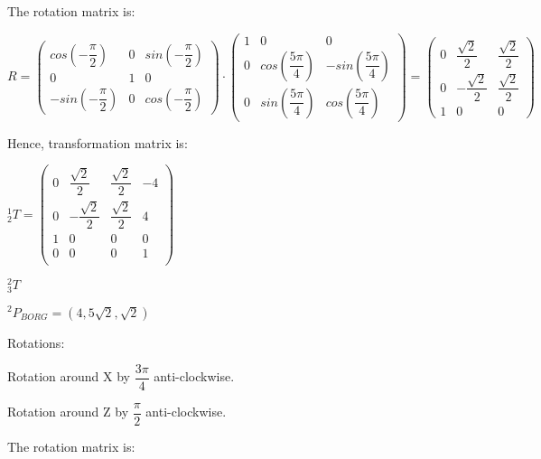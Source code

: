 \documentclass[12pt]{article}
\begin{document}
\begin{list}{)~}{}
The rotation matrix is:

$R=\left(\begin{array}{ccc}
cos \left( -\dfrac{\pi}{2} \right) & 0 & sin \left( -\dfrac{\pi}{2} \right) \\
0 & 1 & 0\\
-sin \left( -\dfrac{\pi}{2} \right) & 0 & cos \left(-\dfrac{\pi}{2} \right)
\end{array}\right)
\cdot
\left(\begin{array}{ccc}
1 & 0 & 0 \\
0 & cos \left( \dfrac{5 \pi}{4} \right) & -sin \left( \dfrac{5 \pi}{4} \right) \\
0 & sin \left( \dfrac{5 \pi}{4} \right) & cos \left( \dfrac{5 \pi}{4} \right) \end{array}\right)=
\left(\begin{array}{ccc}
0 & \dfrac{\sqrt{2}}{2} & \dfrac{\sqrt{2}}{2} \\
0 & -\dfrac{\sqrt{2}}{2} & \dfrac{\sqrt{2}}{2} \\
1 & 0 & 0\end{array}\right)$

Hence, transformation matrix is:
 
$_{2}^1T = \left(\begin{array}{cccc}
0 & \dfrac{\sqrt{2}}{2} & \dfrac{\sqrt{2}}{2} & -4 \\
0 & -\dfrac{\sqrt{2}}{2} & \dfrac{\sqrt{2}}{2} &  4 \\
1 & 0 & 0 & 0\\
0 & 0 & 0 & 1\\
\end{array}\right)$

\item
$_{3}^2T$

$^2 P_{BORG} = \left(4, 5\sqrt{2}, \sqrt{2}\right)$

Rotations:
\begin{list}{)~}{}
\item Rotation around X by $\dfrac{3\pi}{4}$ anti-clockwise.
\item Rotation around Z by $\dfrac{\pi}{2}$ anti-clockwise.
\end{list}
 
The rotation matrix is:


\end{list}
\end{document}

